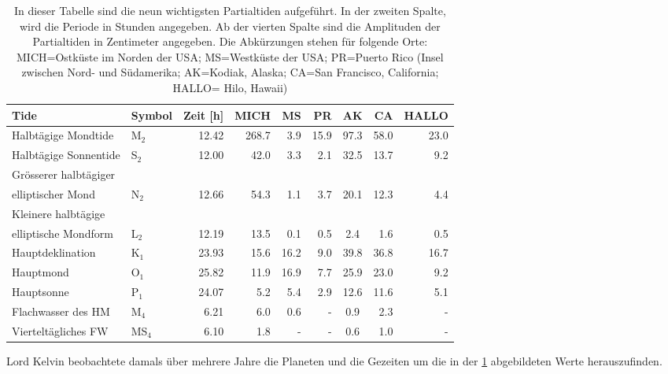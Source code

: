 \begin{table}
	\centering
	
\begin{tabular}{|l|l|r|r|r|r|c|r|r|}
	\hline
	Tide&Symbol&Zeit [h]&MICH&MS&PR&AK&CA&HALLO\\
	\hline \hline
	Halbtägige Mondtide&M$_{2}$&12.42&268.7&3.9&15.9&97.3&58.0&23.0\\
	\hline
	Halbtägige Sonnentide&S$_{2}$&12.00&42.0&3.3&2.1&32.5&13.7&9.2\\
	\hline
	Grösserer halbtägiger&&&&&&&&\\
	elliptischer Mond&N$_{2}$&12.66&54.3&1.1&3.7&20.1&12.3&4.4\\
	\hline
	Kleinere halbtägige&&&&&&&&\\
	elliptische Mondform&L$_{2}$&12.19&13.5&0.1&0.5&2.4&1.6&0.5\\
	\hline\hline 
	Hauptdeklination&K$_{1}$&23.93&15.6&16.2&9.0&39.8&36.8&16.7\\
	\hline
	Hauptmond&O$_{1}$&25.82&11.9&16.9&7.7&25.9&23.0&9.2\\
	\hline
	Hauptsonne&P$_{1}$&24.07&5.2&5.4&2.9&12.6&11.6&5.1\\
	\hline\hline
	Flachwasser des HM&M$_{4}$&6.21&6.0&0.6&-&0.9&2.3&-\\
	\hline
	Vierteltägliches FW&MS$_{4}$&6.10&1.8&-&-&0.6&1.0&-\\
	\hline	
\end{tabular}
	
\caption{In dieser Tabelle sind die neun wichtigsten Partialtiden aufgeführt. In der zweiten Spalte, wird die Periode in Stunden angegeben. Ab der vierten Spalte sind die Amplituden der Partialtiden in Zentimeter angegeben. Die Abkürzungen stehen für folgende Orte: MICH=Ostküste im Norden der USA; MS=Westküste der USA; PR=Puerto Rico (Insel zwischen Nord- und Südamerika; AK=Kodiak, Alaska; CA=San Francisco, California; HALLO= Hilo, Hawaii)}
\label{gezeiten:tabelle:partialtiden}
\end{table}

Lord Kelvin beobachtete damals über mehrere Jahre die Planeten und die Gezeiten um die in der \ref{gezeiten:tabelle:partialtiden} abgebildeten Werte herauszufinden. 

